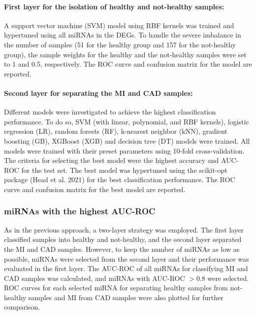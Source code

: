 \documentclass[smallextended]{svjour3}       %
\begin{document}
\hypertarget{first-layer-for-the-isolation-of-healthy-and-not-healthy-samples}{%
\paragraph{First layer for the isolation of healthy and not-healthy
samples:}\label{first-layer-for-the-isolation-of-healthy-and-not-healthy-samples}}

A support vector machine (SVM) model using RBF kernels was trained and
hypertuned using all miRNAs in the DEGs. To handle the severe imbalance
in the number of samples (51 for the healthy group and 157 for the
not-healthy group), the sample weights for the healthy and the
not-healthy samples were set to 1 and 0.5, respectively. The ROC curve
and confusion matrix for the model are reported.

\hypertarget{second-layer-for-separating-the-mi-and-cad-samples}{%
\paragraph{Second layer for separating the MI and CAD
samples:}\label{second-layer-for-separating-the-mi-and-cad-samples}}

Different models were investigated to achieve the highest classification
performance. To do so, SVM (with linear, polynomial, and RBF kernels),
logistic regression (LR), random forests (RF), k-nearest neighbor (kNN),
gradient boosting (GB), XGBoost (XGB) and decision tree (DT) models were
trained. All models were trained with their preset parameters using
10-fold cross-validation. The criteria for selecting the best model were
the highest accuracy and AUC-ROC for the test set. The best model was
hypertuned using the scikit-opt package (Head et al. 2021) for the best
classification performance. The ROC curve and confusion matrix for the
best model are reported.

\hypertarget{mirnas-with-the-highest-auc-roc}{%
\subsubsection{miRNAs with the highest
AUC-ROC}\label{mirnas-with-the-highest-auc-roc}}

As in the previous approach, a two-layer strategy was employed. The
first layer classified samples into healthy and not-healthy, and the
second layer separated the MI and CAD samples. However, to keep the
number of miRNAs as low as possible, miRNAs were selected from the
second layer and their performance was evaluated in the first layer. The
AUC-ROC of all miRNAs for classifying MI and CAD samples was calculated,
and miRNAs with AUC-ROC \(> 0.8\) were selected. ROC curves for each
selected miRNA for separating healthy samples from not-healthy samples
and MI from CAD samples were also plotted for further comparison.
\end{document}
